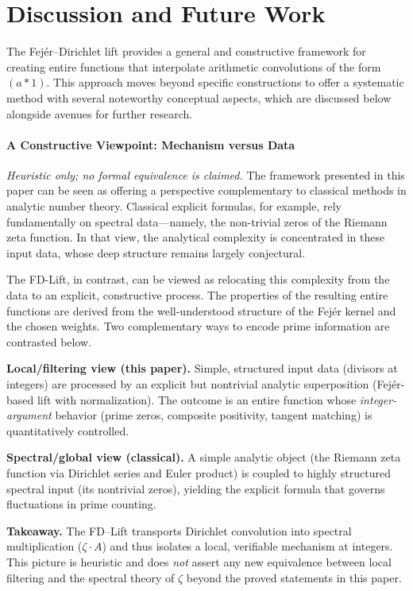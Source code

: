 \section{Discussion and Future Work}

The Fej\'er--Dirichlet lift provides a general and constructive framework for creating entire functions that interpolate arithmetic convolutions of the form $(a*1)$. This approach moves beyond specific constructions to offer a systematic method with several noteworthy conceptual aspects, which are discussed below alongside avenues for further research.

\paragraph{A Constructive Viewpoint: Mechanism versus Data}
\emph{Heuristic only; no formal equivalence is claimed.}
The framework presented in this paper can be seen as offering a perspective complementary to classical methods in analytic number theory. Classical explicit formulas, for example, rely fundamentally on spectral data—namely, the non-trivial zeros of the Riemann zeta function. In that view, the analytical complexity is concentrated in these input data, whose deep structure remains largely conjectural.

The FD-Lift, in contrast, can be viewed as relocating this complexity from the data to an explicit, constructive process. The properties of the resulting entire functions are derived from the well-understood structure of the Fej\'er kernel and the chosen weights. Two complementary ways to encode prime information are contrasted below.

\textbf{Local/filtering view (this paper).} Simple, structured input data (divisors at integers) are processed by an explicit but nontrivial analytic superposition (Fej\'er-based lift with normalization). The outcome is an entire function whose \emph{integer-argument} behavior (prime zeros, composite positivity, tangent matching) is quantitatively controlled.

\textbf{Spectral/global view (classical).} A simple analytic object (the Riemann zeta function via Dirichlet series and Euler product) is coupled to highly structured spectral input (its nontrivial zeros), yielding the explicit formula that governs fluctuations in prime counting.

\textbf{Takeaway.} The FD–Lift transports Dirichlet convolution into spectral multiplication ($\zeta\cdot A$) and thus isolates a local, verifiable mechanism at integers. This picture is heuristic and does \emph{not} assert any new equivalence between local filtering and the spectral theory of $\zeta$ beyond the proved statements in this paper.


